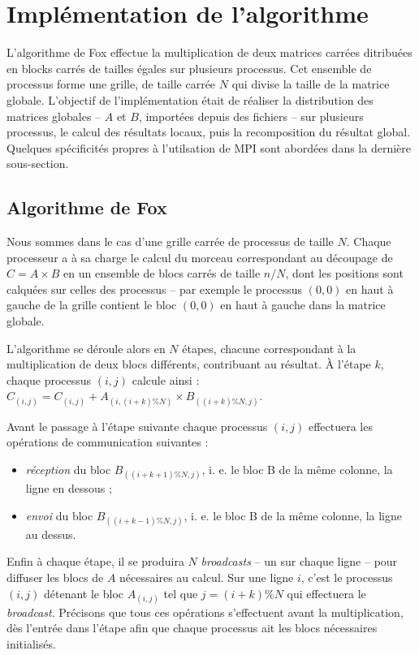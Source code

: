 \section{Implémentation de l'algorithme}

L'algorithme de Fox effectue la multiplication de deux matrices carrées ditribuées en blocks carrés de tailles égales sur plusieurs processus. Cet ensemble de processus forme une grille, de taille carrée $N$ qui divise la taille de la matrice globale. L'objectif de l'implémentation était de réaliser la distribution des matrices globales -- $A$ et $B$, importées depuis des fichiers -- sur plusieurs processus, le calcul des résultats locaux, puis la recomposition du résultat global. Quelques spécificités propres à l'utilsation de MPI sont abordées dans la dernière sous-section.

\subsection{Algorithme de Fox}

Nous sommes dans le cas d'une grille carrée de processus de taille $N$. Chaque processeur a à sa charge le calcul du morceau correspondant au découpage de $C = A\times B$ en un ensemble de blocs carrés de taille $n/N$, dont les positions sont calquées sur celles des processus -- par exemple le processus $(0,0)$ en haut à gauche de la grille contient le bloc $(0,0)$ en haut à gauche dans la matrice globale.

L'algorithme se déroule alors en $N$ étapes, chacune correspondant à la multiplication de deux blocs différents, contribuant au résultat. \`A l'étape $k$, chaque processus $(i,j)$ calcule ainsi : $C_{(i,j)} = C_{(i,j)} + A_{(i,(i+k)\%N)} \times B_{((i+k)\%N,j)}$.

Avant le passage à l'étape suivante chaque processus $(i,j)$ effectuera les opérations de communication suivantes : 
\begin{itemize}
\item \emph{réception} du bloc $B_{((i+k+1)\%N,j)}$, i. e. le bloc B de la même colonne, la ligne en dessous ;
\item \emph{envoi} du bloc  $B_{((i+k-1)\%N,j)}$, i. e. le bloc B de la même colonne, la ligne au dessus.
\end{itemize}

Enfin à chaque étape, il se produira $N$ \emph{broadcasts} -- un sur chaque ligne -- pour diffuser les blocs de $A$ nécessaires au calcul. Sur une ligne $i$, c'est le processus $(i,j)$ détenant le bloc $A_{(i,j)}$ tel que $j = (i+k)\%N$ qui effectuera le \emph{broadcast}. Précisons que tous ces opérations s'effectuent avant la multiplication, dès l'entrée dans l'étape afin que chaque processus ait les blocs nécessaires initialisés.

